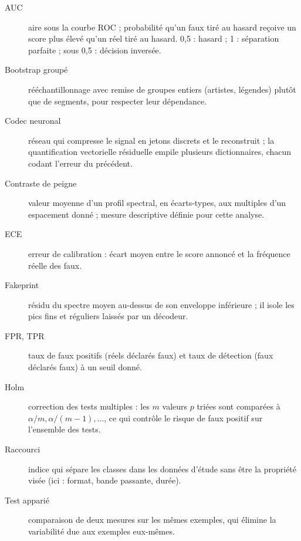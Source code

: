 \documentclass[a4paper, 11pt]{article}
\begin{document}
\begin{description}
    \item[AUC] aire sous la courbe ROC ; probabilité qu'un faux tiré au hasard reçoive un score plus élevé
    qu'un réel tiré au hasard. 0,5 : hasard ; 1 : séparation parfaite ; sous 0,5 : décision inversée.
    \item[Bootstrap groupé] rééchantillonnage avec remise de groupes entiers (artistes, légendes) plutôt que
    de segments, pour respecter leur dépendance.
    \item[Codec neuronal] réseau qui compresse le signal en jetons discrets et le reconstruit ; la
    quantification vectorielle résiduelle empile plusieurs dictionnaires, chacun codant l'erreur du précédent.
    \item[Contraste de peigne] valeur moyenne d'un profil spectral, en écarts-types, aux multiples d'un
    espacement donné ; mesure descriptive définie pour cette analyse.
    \item[ECE] erreur de calibration : écart moyen entre le score annoncé et la fréquence réelle des faux.
    \item[Fakeprint] résidu du spectre moyen au-dessus de son enveloppe inférieure ; il isole les pics fins
    et réguliers laissés par un décodeur.
    \item[FPR, TPR] taux de faux positifs (réels déclarés faux) et taux de détection (faux déclarés faux) à
    un seuil donné.
    \item[Holm] correction des tests multiples : les $m$ valeurs $p$ triées sont comparées à
    $\alpha/m, \alpha/(m-1), \dots$, ce qui contrôle le risque de faux positif sur l'ensemble des tests.
    \item[Raccourci] indice qui sépare les classes dans les données d'étude sans être la propriété visée
    (ici : format, bande passante, durée).
    \item[Test apparié] comparaison de deux mesures sur les mêmes exemples, qui élimine la variabilité due
    aux exemples eux-mêmes.
\end{description}
\end{document}
